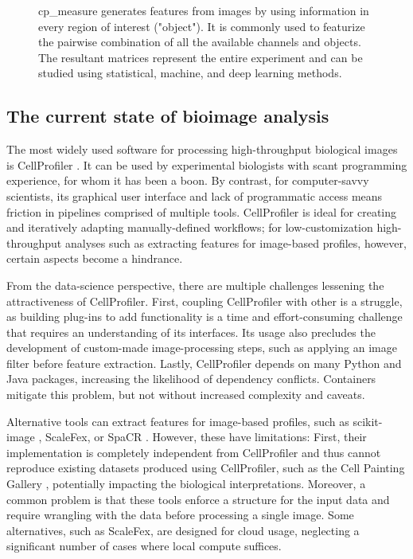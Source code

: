 \documentclass{article}
\begin{document}
\begin{figure}[htbp]
\centering

\caption{\label{fig:overview}cp\_measure generates features from images by using information in every region of interest ("object"). It is commonly used to featurize the pairwise combination of all the available channels and objects. The resultant matrices represent the entire experiment and can be studied using statistical, machine, and deep learning methods.}
\end{figure}

\subsection{The current state of bioimage analysis}
\label{sec:org8f5b33d}
The most widely used software for processing high-throughput biological images is CellProfiler \citep{stirlingCellProfiler4Improvements2021}. It can be used by experimental biologists with scant programming experience, for whom it has been a boon. By contrast, for computer-savvy scientists, its graphical user interface and lack of programmatic access means friction in pipelines comprised of multiple tools. CellProfiler is ideal for creating and iteratively adapting manually-defined workflows; for low-customization high-throughput analyses such as extracting features for image-based profiles, however, certain aspects become a hindrance.

From the data-science perspective, there are multiple challenges lessening the attractiveness of CellProfiler. First, coupling CellProfiler with other is a struggle, as building plug-ins to add functionality is a time and effort-consuming challenge that requires an understanding of its interfaces. Its usage also precludes the development of custom-made image-processing steps, such as applying an image filter before feature extraction. Lastly, CellProfiler depends on many Python and Java packages, increasing the likelihood of dependency conflicts. Containers mitigate this problem, but not without increased complexity and caveats.

Alternative tools can extract features for image-based profiles, such as scikit-image \citep{waltScikitimageImageProcessing2014}, ScaleFex, or SpaCR \citep{comoletHighlyEfficientScalable2024,einarolafssonSpaCr2025} . However, these have limitations: First, their implementation is completely independent from CellProfiler and thus cannot reproduce existing datasets produced using CellProfiler, such as the Cell Painting Gallery \cite{weisbartCellPaintingGallery2024,fayRxRx3PhenomicsMap2023}, potentially impacting the biological interpretations. Moreover, a common problem is that these tools enforce a structure for the input data and require wrangling with the data before processing a single image. Some alternatives, such as ScaleFex, are designed for cloud usage, neglecting a significant number of cases where local compute suffices. 
\end{document}
